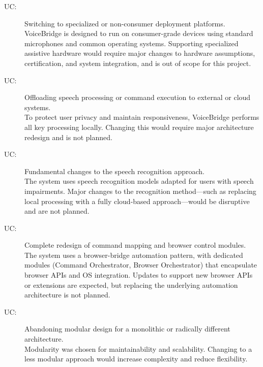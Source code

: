 \documentclass[12pt, titlepage]{article}
\newcounter{ucnum}
\newcommand{\uctheucnum}{UC\theucnum}
\begin{document}
\begin{description}

\item[ \uctheucnum \label{ucHardwarePlatform}:]
Switching to specialized or non-consumer deployment platforms. \\
VoiceBridge is designed to run on consumer-grade devices using standard microphones and common operating systems. Supporting specialized assistive hardware would require major changes to hardware assumptions, certification, and system integration, and is out of scope for this project.

\item[ \uctheucnum \label{ucProcessingOffload}:]
Offloading speech processing or command execution to external or cloud systems. \\
To protect user privacy and maintain responsiveness, VoiceBridge performs all key processing locally. Changing this would require major architecture redesign and is not planned.

\item[ \uctheucnum \label{ucASRMethod}:]
Fundamental changes to the speech recognition approach. \\
The system uses speech recognition models adapted for users with speech impairments. Major changes to the recognition method—such as replacing local processing with a fully cloud-based approach—would be disruptive and are not planned.

\item[ \uctheucnum \label{ucCommandSystem}:]
Complete redesign of command mapping and browser control modules. \\
The system uses a browser-bridge automation pattern, with dedicated modules (Command Orchestrator, Browser Orchestrator) that encapsulate browser APIs and OS integration. Updates to support new browser APIs or extensions are expected, but replacing the underlying automation architecture is not planned.

\item[ \uctheucnum \label{ucArchitecture}:]
Abandoning modular design for a monolithic or radically different architecture. \\
Modularity was chosen for maintainability and scalability. Changing to a less modular approach would increase complexity and reduce flexibility.

\end{description}
\end{document}

